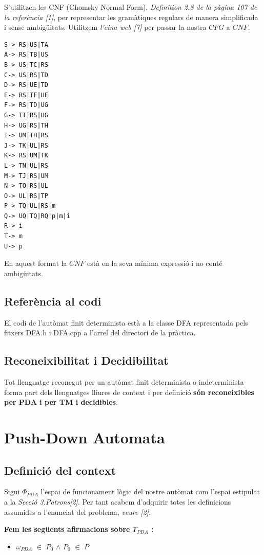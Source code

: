\documentclass[12pt,a4paper]{report}
\def \wpda{$\omega_{PDA} $}
\def \contextPDA{$\Phi_{PDA}$}
\def \prePDA{$\Upsilon_{PDA}$}
\begin{document}
S’utilitzen les CNF (Chomsky Normal Form), \textit{Definition 2.8 de la pàgina 107 de la referència [1]}, per representar les gramàtiques regulars de manera simplificada i sense ambigüitats. Utilitzem \textit{l’eina web [7]} per passar la nostra $CFG$ a $CNF$.

\begin{lstlisting}
S-> RS|US|TA
A-> RS|TB|US
B-> US|TC|RS
C-> US|RS|TD
D-> RS|UE|TD
E-> RS|TF|UE
F-> RS|TD|UG
G-> TI|RS|UG
H-> UG|RS|TH
I-> UM|TH|RS
J-> TK|UL|RS
K-> RS|UM|TK
L-> TN|UL|RS
M-> TJ|RS|UM
N-> TO|RS|UL
O-> UL|RS|TP
P-> TQ|UL|RS|m
Q-> UQ|TQ|RQ|p|m|i
R-> i
T-> m
U-> p

\end{lstlisting}

En aquest format la $CNF$ està en la seva mínima expressió i no conté ambigüitats.

\section{Referència al codi}

El codi de l'autòmat finit determinista està a la classe DFA representada pels fitxers DFA.h i DFA.cpp a l'arrel del directori de la pràctica.

\section{Reconeixibilitat i Decidibilitat}

Tot llenguatge reconegut per un autòmat finit determinista o indeterminista forma part dels llenguatges lliures de context i per definició \textbf{són reconeixibles per PDA i per TM i decidibles}.

\clearpage

\chapter{Push-Down Automata}

\section{Definició del context}

Sigui \contextPDA{} l'espai de funcionament lògic del nostre autòmat com l'espai estipulat a la \textit{Secció 3.Patrons[2]}. Per tant acabem d'adquirir totes les definicions assumides a l'enunciat del problema, \textit{veure [2]}.

\textbf{Fem les següents afirmacions sobre \prePDA{} :}
\begin{itemize}
\item \wpda{} $\in$ $P_0$ $\wedge$ $P_0$ $\in$ $P$
\end{itemize}
\end{document}
